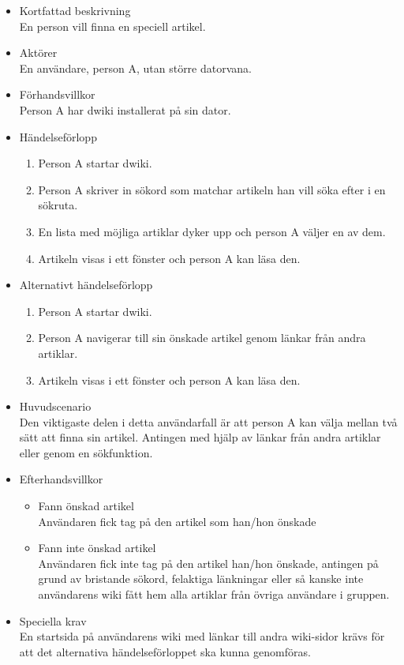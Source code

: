 \begin{itemize}
	\item Kortfattad beskrivning
	\\En person vill finna en speciell artikel.
	\item Aktörer
	\\En användare, person A, utan större datorvana.
	\item Förhandsvillkor
	\\Person A har dwiki installerat på sin dator.
	\item Händelseförlopp
	\begin{enumerate}
		\item Person A startar dwiki.
		\item Person A skriver in sökord som matchar artikeln han vill söka efter i en sökruta.
		\item En lista med möjliga artiklar dyker upp och person A väljer en av dem.
		\item Artikeln visas i ett fönster och person A kan läsa den.
	\end{enumerate}
	\item Alternativt händelseförlopp
	\begin{enumerate}
		\item Person A startar dwiki.
		\item Person A navigerar till sin önskade artikel genom länkar från andra artiklar.	
		\item Artikeln visas i ett fönster och person A kan läsa den.
	\end{enumerate}	
	\item Huvudscenario
	\\Den viktigaste delen i detta användarfall är att person A kan välja mellan två sätt att finna sin artikel. Antingen med hjälp av länkar från andra artiklar eller genom en sökfunktion.
	\item Efterhandsvillkor
	\begin{itemize}
	\item Fann önskad artikel
	\\Användaren fick tag på den artikel som han/hon önskade
	\item Fann inte önskad artikel
	\\Användaren fick inte tag på den artikel han/hon önskade, antingen på grund av bristande sökord, felaktiga länkningar eller så kanske inte användarens wiki fått hem alla artiklar från övriga användare i gruppen.
	\end{itemize}
	\item Speciella krav
	\\En startsida på användarens wiki med länkar till andra wiki-sidor krävs för att det alternativa händelseförloppet ska kunna genomföras.
\end{itemize}

